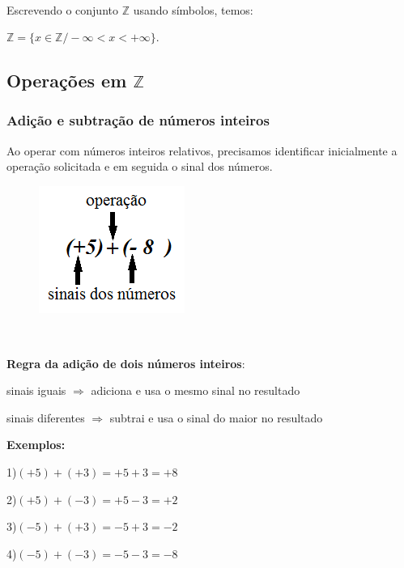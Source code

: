 ~~

Escrevendo o conjunto $\mathbb{Z}$  usando símbolos, temos: 

$\mathbb{Z} = \{x \in \mathbb{Z}/ -\infty < x < +\infty\}$.

\subsection{Operações em $\mathbb{Z}$}

\subsubsection{Adição e subtração de números inteiros}

Ao operar com números inteiros relativos, precisamos identificar inicialmente a operação solicitada e em seguida o sinal dos números.

\begin{figure}[H]
	\begin{Center}
		\includegraphics[width=1.88in,height=1.64in]{capitulos/conjuntos_numericos/media/image7.png}
	\end{Center}
\end{figure}

~~
\begin{center}
\textbf{Regra da adição de dois números inteiros}:
\end{center}

\begin{caixa}
    sinais iguais $\Rightarrow$ adiciona e usa o mesmo sinal no resultado

    sinais diferentes $\Rightarrow$ subtrai e usa o sinal do maior no resultado

\end{caixa}
\textbf{Exemplos:}
\begin{multicols}{2}
    1)$(+5) + (+3) = +5+3 = +8$ 

    2)$(+5) + (- 3) = +5 - 3 = +2$ 
    
    3)$(-5) + (+ 3) = -5 + 3 = -2$

    4)$(-5) + (- 3) = -5 - 3 = -8$
\end{multicols}

